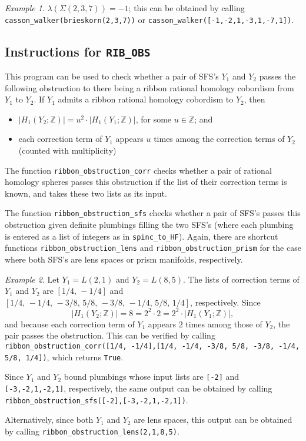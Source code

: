 \documentclass[12pt]{amsart}
\theoremstyle{definition}
\theoremstyle{remark}
\newtheorem*{example*}{Example}
\numberwithin{equation}{section}
\begin{document}
\begin{example*}
$\lambda(\Sigma(2,3,7))=-1$; this can be obtained by calling \texttt{casson\_walker(brieskorn(2,3,7))} or \texttt{casson\_walker([-1,-2,1,-3,1,-7,1])}.
\end{example*}

\subsection*{Instructions for \texttt{RIB\_OBS}}

This program can be used to check whether a pair of SFS's $Y_1$ and $Y_2$ passes the following obstruction to there being a ribbon rational homology cobordism from $Y_1$ to $Y_2$.
If $Y_1$ admits a ribbon rational homology cobordism to $Y_2$, then
\begin{itemize}
\item $|H_{1}(Y_{2};\mathbb{Z})|=u^{2}\cdot|H_{1}(Y_{1};\mathbb{Z})|$, for some $u\in\mathbb{Z}$; and
\item each correction term of $Y_{1}$ appears $u$ times among the correction terms of $Y_{2}$ (counted with multiplicity)
\end{itemize}
The function \texttt{ribbon\_obstruction\_corr} checks whether a pair of rational homology spheres passes this obstruction if the list of their correction terms is known, and takes these two lists as its input.

The function \texttt{ribbon\_obstruction\_sfs} checks whether a pair of SFS's passes this obstruction given definite plumbings filling the two SFS's (where each plumbing is entered as a list of integers as in \texttt{spinc\_to\_HF}).
Again, there are shortcut functions \texttt{ribbon\_obstruction\_lens} and \texttt{ribbon\_obstruction\_prism} for the case where both SFS's are lens spaces or prism manifolds, respectively.

\begin{example*}
Let $Y_{1}=L(2,1)$ and $Y_{2}=L(8,5)$.
The lists of correction terms of $Y_{1}$ and $Y_{2}$ are $[1/4,\,-1/4]$ and $[1/4,\,-1/4,\,-3/8,\,5/8,\,-3/8,\,-1/4,\,5/8,\,1/4]$, respectively.
Since \[|H_{1}(Y_{2};\mathbb{Z})|=8=2^{2}\cdot 2=2^{2}\cdot|H_{1}(Y_{1};\mathbb{Z})|,\] and because each correction term of $Y_{1}$ appears $2$ times among those of $Y_{2}$, the pair passes the obstruction.
This can be verified by calling \texttt{ribbon\_obstruction\_corr([1/4, -1/4],[1/4, -1/4, -3/8, 5/8, -3/8, -1/4, 5/8, 1/4])}, which returns \texttt{True}.

Since $Y_{1}$ and $Y_{2}$ bound plumbings whose input lists are \texttt{[-2]} and \texttt{[-3,-2,1,-2,1]}, respectively, the same output can be obtained by calling \texttt{ribbon\_obstruction\_sfs([-2],[-3,-2,1,-2,1])}.

Alternatively, since both $Y_{1}$ and $Y_{2}$ are lens spaces, this output can be obtained by calling \texttt{ribbon\_obstruction\_lens(2,1,8,5)}.
\end{example*}
\end{document}
